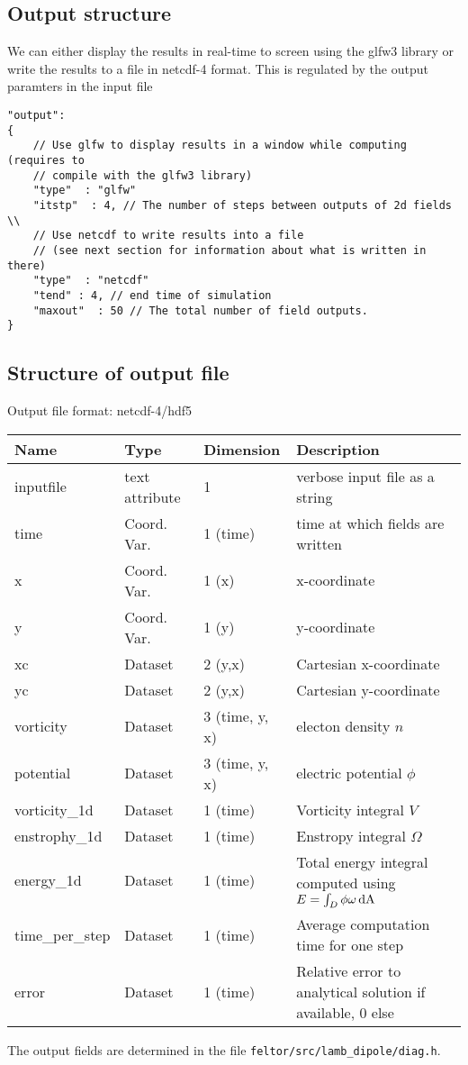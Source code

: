 \subsection{Output structure}

We can either display the results in real-time to screen using the glfw3 library or
write the results to a file in netcdf-4 format.
This is regulated by the output paramters in the input file
\begin{verbatim}
"output":
{
    // Use glfw to display results in a window while computing (requires to
    // compile with the glfw3 library)
    "type"  : "glfw"
    "itstp"  : 4, // The number of steps between outputs of 2d fields \\
    // Use netcdf to write results into a file
    // (see next section for information about what is written in there)
    "type"  : "netcdf"
    "tend" : 4, // end time of simulation
    "maxout"  : 50 // The total number of field outputs.
}
\end{verbatim}
\subsection{Structure of output file}
Output file format: netcdf-4/hdf5
%
\begin{longtable}{lll>{\RaggedRight}p{7cm}}
\toprule
\rowcolor{gray!50}\textbf{Name} &  \textbf{Type} & \textbf{Dimension} & \textbf{Description}  \\ \midrule
inputfile  &             text attribute & 1 & verbose input file as a string \\
time                     & Coord. Var. & 1 (time) & time at which fields are written \\
x                        & Coord. Var. & 1 (x) & x-coordinate  \\
y                        & Coord. Var. & 1 (y) & y-coordinate \\
xc                       & Dataset & 2 (y,x) & Cartesian x-coordinate  \\
yc                       & Dataset & 2 (y,x) & Cartesian y-coordinate \\
vorticity                & Dataset & 3 (time, y, x) & electon density $n$ \\
potential                & Dataset & 3 (time, y, x) & electric potential $\phi$  \\
vorticity\_1d            & Dataset & 1 (time) & Vorticity integral $V$  \\
enstrophy\_1d            & Dataset & 1 (time) & Enstropy integral $\Omega$  \\
energy\_1d               & Dataset & 1 (time) & Total energy integral computed using $E = \int_D \phi\omega \,\mathrm{dA}$ \\
time\_per\_step          & Dataset & 1 (time) & Average computation time for one step \\
error                    & Dataset & 1 (time) & Relative error to analytical solution if available, 0 else \\
\bottomrule
\end{longtable}
The output fields are determined in the file \texttt{feltor/src/lamb\_dipole/diag.h}.





